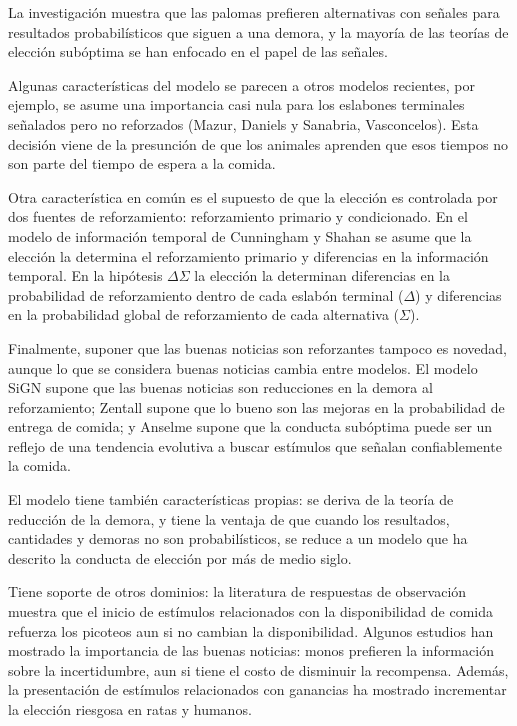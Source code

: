 \documentclass[a4paper,12pt]{article}
\begin{document}
La investigación muestra que las palomas prefieren alternativas con señales para resultados probabilísticos que siguen a una demora, y la mayoría de las teorías de elección subóptima se han enfocado en el papel de las señales.

Algunas características del modelo se parecen a otros modelos recientes, por ejemplo, se asume una importancia casi nula para los eslabones terminales señalados pero no reforzados (Mazur, Daniels y Sanabria, Vasconcelos).
Esta decisión viene de la presunción de que los animales aprenden que esos tiempos no son parte del tiempo de espera a la comida.

Otra característica en común es el supuesto de que la elección es controlada por dos fuentes de reforzamiento: reforzamiento primario y condicionado.
En el modelo de información temporal de Cunningham y Shahan se asume que la elección la determina el reforzamiento primario y diferencias en la información temporal.
En la hipótesis $\Delta \Sigma$ la elección la determinan diferencias en la probabilidad de reforzamiento dentro de cada eslabón terminal ($\Delta$) y diferencias en la probabilidad global de reforzamiento de cada alternativa ($\Sigma$).

Finalmente, suponer que las buenas noticias son reforzantes tampoco es novedad, aunque lo que se considera buenas noticias cambia entre modelos.
El modelo SiGN supone que las buenas noticias son reducciones en la demora al reforzamiento; Zentall supone que lo bueno son las mejoras en la probabilidad de entrega de comida; y Anselme supone que la conducta subóptima puede ser un reflejo de una tendencia evolutiva a buscar estímulos que señalan confiablemente la comida.

El modelo tiene también características propias: se deriva de la teoría de reducción de la demora, y tiene la ventaja de que cuando los resultados, cantidades y demoras no son probabilísticos, se reduce a un modelo que ha descrito la conducta de elección por más de medio siglo.

Tiene soporte de otros dominios: la literatura de respuestas de observación muestra que el inicio de estímulos relacionados con la disponibilidad de comida refuerza los picoteos aun si no cambian la disponibilidad.
Algunos estudios han mostrado la importancia de las buenas noticias: monos prefieren la información sobre la incertidumbre, aun si tiene el costo de disminuir la recompensa.
Además, la presentación de estímulos relacionados con ganancias ha mostrado incrementar la elección riesgosa en ratas y humanos.
\end{document}
